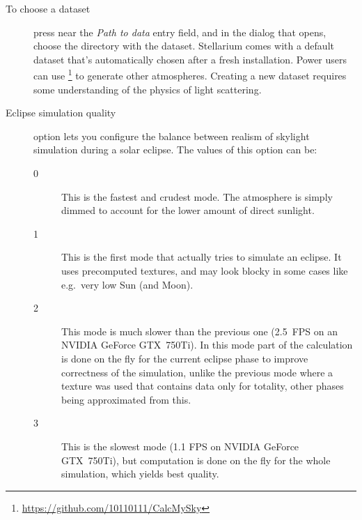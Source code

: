 \begin{description}
\item[To choose a dataset] press 
  near the \emph{Path to data} entry field, and in the dialog that
  opens, choose the directory with the dataset.  Stellarium comes with
  a default dataset that's automatically chosen after a fresh
  installation.  Power users can use
  \footnote{\url{https://github.com/10110111/CalcMySky}}
  to generate other atmospheres. Creating a new dataset requires some
  understanding of the physics of light scattering.
\item[Eclipse simulation quality] option lets you configure the
  balance between realism of skylight simulation during a solar
  eclipse. The values of this option can be:
  \begin{description}
  \item[0] This is the fastest and crudest mode. The atmosphere is
    simply dimmed to account for the lower amount of direct sunlight.
  \item[1] This is the first mode that actually tries to simulate an
    eclipse. It uses precomputed textures, and may look blocky in some
    cases like e.g.\ very low Sun (and Moon).
  \item[2] This mode is much slower than the previous one (2.5~FPS on
    an NVIDIA GeForce GTX~750Ti).  In this mode part of the
    calculation is done on the fly for the current eclipse phase to
    improve correctness of the simulation, unlike the previous mode
    where a texture was used that contains data only for totality,
    other phases being approximated from this.
  \item[3] This is the slowest mode (1.1 FPS on NVIDIA GeForce
    GTX~750Ti), but computation is done on the fly for the whole
    simulation, which yields best quality.
  \end{description}
\end{description}


